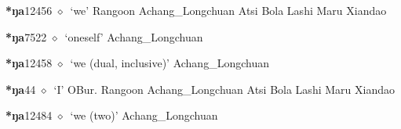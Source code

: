  \begin{list}{}{\leftmargin=1.5em \itemindent=-1.5em}
  \item {\footnotesize \textbf{*ŋa}}{\tiny 12456}
         $\diamond$~`we'
         Rangoon 
\hspace{1ex}
         Achang\_Longchuan 
\hspace{1ex}
         Atsi 
\hspace{1ex}
         Bola 
\hspace{1ex}
         Lashi 
\hspace{1ex}
         Maru 
\hspace{1ex}
         Xiandao 
  \item {\footnotesize \textbf{*ŋa}}{\tiny 7522}
\hspace{1ex}
         $\diamond$~`oneself'
         Achang\_Longchuan 
  \item {\footnotesize \textbf{*ŋa}}{\tiny 12458}
\hspace{1ex}
         $\diamond$~`we (dual, inclusive)'
         Achang\_Longchuan 
  \item {\footnotesize \textbf{*ŋa}}{\tiny 44}
\hspace{1ex}
         $\diamond$~`I'
         OBur. 
\hspace{1ex}
         Rangoon 
\hspace{1ex}
         Achang\_Longchuan 
\hspace{1ex}
         Atsi 
\hspace{1ex}
         Bola 
\hspace{1ex}
         Lashi 
\hspace{1ex}
         Maru 
\hspace{1ex}
         Xiandao 
  \item {\footnotesize \textbf{*ŋa}}{\tiny 12484}
\hspace{1ex}
         $\diamond$~`we (two)'
         Achang\_Longchuan 
  \end{list}
